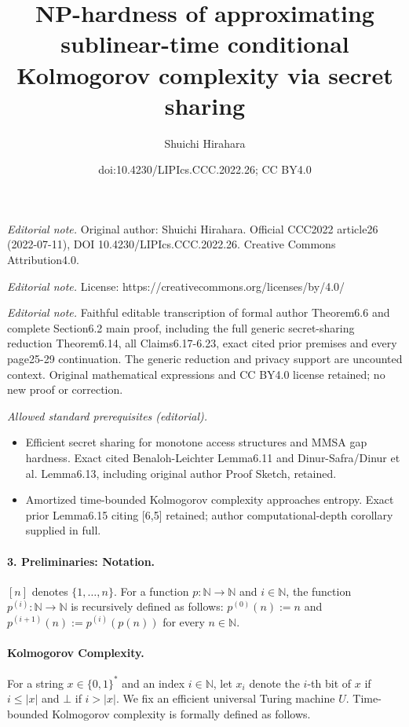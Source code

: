 \documentclass[10pt,a4paper]{article}
\title{NP-hardness of approximating sublinear-time conditional Kolmogorov complexity via secret sharing}
\author{Shuichi Hirahara}
\date{doi:10.4230/LIPIcs.CCC.2022.26; CC BY4.0}
\begin{document}
\maketitle
\noindent\textit{Editorial note.} Original author: Shuichi Hirahara. Official CCC2022 article26 (2022-07-11), DOI 10.4230/LIPIcs.CCC.2022.26. Creative Commons Attribution4.0.\par\medskip
\noindent\textit{Editorial note.} License: https://creativecommons.org/licenses/by/4.0/\par\medskip
\noindent\textit{Editorial note.} Faithful editable transcription of formal author Theorem6.6 and complete Section6.2 main proof, including the full generic secret-sharing reduction Theorem6.14, all Claims6.17-6.23, exact cited prior premises and every page25-29 continuation. The generic reduction and privacy support are uncounted context. Original mathematical expressions and CC BY4.0 license retained; no new proof or correction.\par\medskip
\noindent\textit{Allowed standard prerequisites (editorial).}\begin{itemize}
\item Efficient secret sharing for monotone access structures and MMSA gap hardness. Exact cited Benaloh-Leichter Lemma6.11 and Dinur-Safra/Dinur et al. Lemma6.13, including original author Proof Sketch, retained.
\item Amortized time-bounded Kolmogorov complexity approaches entropy. Exact prior Lemma6.15 citing [6,5] retained; author computational-depth corollary supplied in full.
\end{itemize}\medskip
\paragraph{3. Preliminaries: Notation.}
$[n]$ denotes $\{1,\ldots,n\}$. For a function $p:\mathbb N\to\mathbb N$ and $i\in\mathbb N$, the function $p^{(i)}:\mathbb N\to\mathbb N$ is recursively defined as follows: $p^{(0)}(n):=n$ and $p^{(i+1)}(n):=p^{(i)}(p(n))$ for every $n\in\mathbb N$.
\paragraph{Kolmogorov Complexity.}
For a string $x\in\{0,1\}^*$ and an index $i\in\mathbb N$, let $x_i$ denote the $i$-th bit of $x$ if $i\leq|x|$ and $\bot$ if $i>|x|$. We fix an efficient universal Turing machine $U$. Time-bounded Kolmogorov complexity is formally defined as follows.
\end{document}
